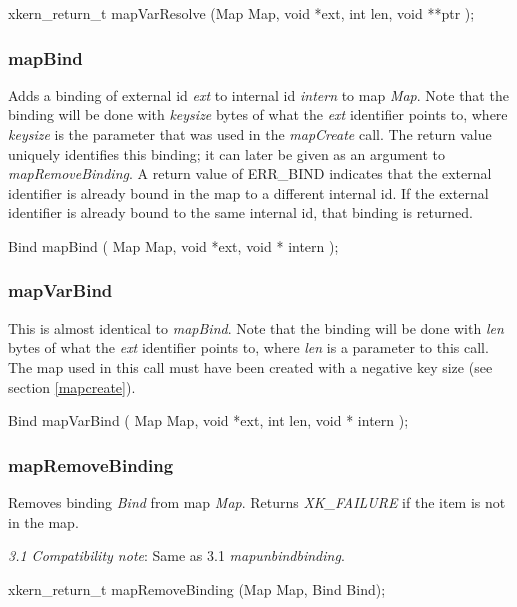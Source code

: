 {\sem xkern\_return\_t} {\bold mapVarResolve} ({\sem Map} {\caps Map}, 
{\sem void} *{\caps ext}, 
{\sem int} {\caps len}, 
{\sem void} **{\caps ptr} );

\subsubsection{mapBind}

Adds a binding of external id {\em ext} to internal id {\em intern}
to map {\em Map}.  Note that the binding will be done with {\em
keysize} bytes of what the {\em ext} identifier points to, where {\em
keysize} is the parameter that was used in the {\em mapCreate} call.
The return value uniquely identifies this binding; it can later be
given as an argument to {\em mapRemoveBinding}.  
A return
value of ERR\_BIND indicates that the external identifier is already
bound in the map to a different internal id.  If the external
identifier is already bound to the same internal id, that binding is
returned.
\medskip

{\sem Bind} {\bold mapBind} 
(
{\sem Map} {\caps Map}, 
{\sem void} *{\caps ext}, 
{\sem void *} {\caps intern}
);

\subsubsection{mapVarBind}

This is almost identical to {\em mapBind}.
Note that the binding will be done with {\em len} bytes of what 
the {\em ext} identifier points to, where {\em len} is a parameter
to this call.
The map used in this call must have been created with a negative
key size (see section \ref{mapcreate}).
\medskip

{\sem Bind} {\bold mapVarBind} 
(
{\sem Map} {\caps Map}, 
{\sem void} *{\caps ext}, 
{\sem int} {\caps len}, 
{\sem void *} {\caps intern}
);

\subsubsection{mapRemoveBinding}

Removes binding {\em Bind} from map {\em Map}.  Returns {\em
XK\_FAILURE} if the item is not in the map.
\medskip

{\em 3.1 Compatibility note}:  Same as 3.1 {\em mapunbindbinding}.
\medskip

{\sem xkern\_return\_t} {\bold mapRemoveBinding} ({\sem Map} {\caps Map}, {\sem Bind} {\caps Bind});


